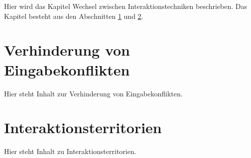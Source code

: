 Hier wird das Kapitel Wechsel zwischen Interaktionstechniken beschrieben. Das Kapitel besteht aus den Abschnitten \ref{sec:verhinderung_von_eingabekonflikten} und \ref{sec:interaktionsterritorien}.


\section{Verhinderung von Eingabekonflikten}
\label{sec:verhinderung_von_eingabekonflikten}

Hier steht Inhalt zur Verhinderung von Eingabekonflikten.


\section{Interaktionsterritorien}
\label{sec:interaktionsterritorien}

Hier steht Inhalt zu Interaktionsterritorien.